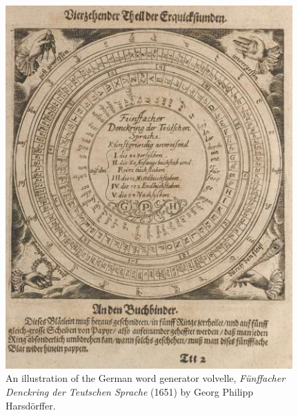 \begin{figure}[p]
    \centering
    \includegraphics[width=0.98\textwidth]{2_Related_Work/images/baroque_volvelle.png}
  
\caption{An illustration of the German word generator volvelle, \textit{F{\"u}nffacher
Denckring der Teutschen Sprache} (1651) by Georg Philipp Harsd{\"o}rffer.}
\label{fig:baroque_volvelle}

\end{figure}
